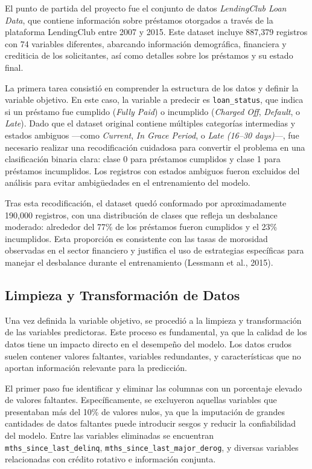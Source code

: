 \documentclass[12pt,a4paper]{article}
\begin{document}
El punto de partida del proyecto fue el conjunto de datos \textit{LendingClub Loan Data}, que contiene información sobre préstamos otorgados a través de la plataforma LendingClub entre 2007 y 2015. Este dataset incluye 887,379 registros con 74 variables diferentes, abarcando información demográfica, financiera y crediticia de los solicitantes, así como detalles sobre los préstamos y su estado final.

La primera tarea consistió en comprender la estructura de los datos y definir la variable objetivo. En este caso, la variable a predecir es \texttt{loan\_status}, que indica si un préstamo fue cumplido (\textit{Fully Paid}) o incumplido (\textit{Charged Off}, \textit{Default}, o \textit{Late}). Dado que el dataset original contiene múltiples categorías intermedias y estados ambiguos ---como \textit{Current}, \textit{In Grace Period}, o \textit{Late (16--30 days)}---, fue necesario realizar una recodificación cuidadosa para convertir el problema en una clasificación binaria clara: clase 0 para préstamos cumplidos y clase 1 para préstamos incumplidos. Los registros con estados ambiguos fueron excluidos del análisis para evitar ambigüedades en el entrenamiento del modelo.

Tras esta recodificación, el dataset quedó conformado por aproximadamente 190,000 registros, con una distribución de clases que refleja un desbalance moderado: alrededor del 77\% de los préstamos fueron cumplidos y el 23\% incumplidos. Esta proporción es consistente con las tasas de morosidad observadas en el sector financiero y justifica el uso de estrategias específicas para manejar el desbalance durante el entrenamiento (Lessmann et al., 2015).

\subsection{Limpieza y Transformación de Datos}

Una vez definida la variable objetivo, se procedió a la limpieza y transformación de las variables predictoras. Este proceso es fundamental, ya que la calidad de los datos tiene un impacto directo en el desempeño del modelo. Los datos crudos suelen contener valores faltantes, variables redundantes, y características que no aportan información relevante para la predicción.

El primer paso fue identificar y eliminar las columnas con un porcentaje elevado de valores faltantes. Específicamente, se excluyeron aquellas variables que presentaban más del 10\% de valores nulos, ya que la imputación de grandes cantidades de datos faltantes puede introducir sesgos y reducir la confiabilidad del modelo. Entre las variables eliminadas se encuentran \texttt{mths\_since\_last\_delinq}, \texttt{mths\_since\_last\_major\_derog}, y diversas variables relacionadas con crédito rotativo e información conjunta.
\end{document}
